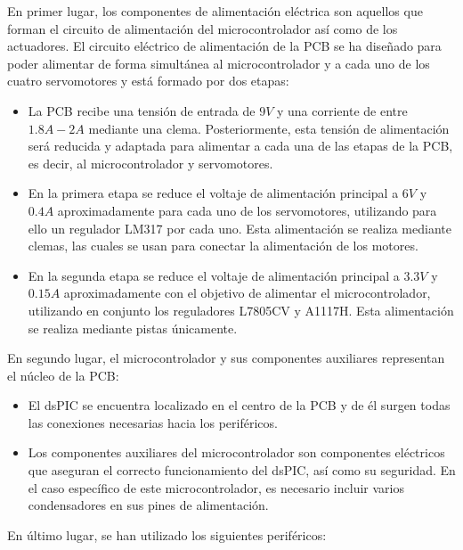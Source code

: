 En primer lugar, los componentes de alimentación eléctrica son aquellos que forman el circuito de alimentación del microcontrolador así como de los actuadores. El circuito eléctrico de alimentación de la \ac{PCB} se ha diseñado para poder alimentar de forma simultánea al microcontrolador y a cada uno de los cuatro servomotores y está formado por dos etapas:
\begin{itemize}
    \item La \ac{PCB} recibe una tensión de entrada de $9V$ y una corriente de entre $1.8A - 2A$ mediante una clema. Posteriormente, esta tensión de alimentación será reducida y adaptada para alimentar a cada una de las etapas de la \ac{PCB}, es decir, al microcontrolador y servomotores.
    \item En la primera etapa se reduce el voltaje de alimentación principal a $6V$ y $0.4A$ aproximadamente para cada uno de los servomotores, utilizando para ello un regulador LM317 por cada uno. Esta alimentación se realiza mediante clemas, las cuales se usan para conectar la alimentación de los motores.
    
    \item En la segunda etapa se reduce el voltaje de alimentación principal a $3.3V$ y $0.15A$ aproximadamente con el objetivo de alimentar el microcontrolador, utilizando en conjunto los reguladores L7805CV y A1117H. Esta alimentación se realiza mediante pistas únicamente.
\end{itemize}

En segundo lugar, el microcontrolador y sus componentes auxiliares representan el núcleo de la \ac{PCB}:
\begin{itemize}
    \item El dsPIC se encuentra localizado en el centro de la \ac{PCB} y de él surgen todas las conexiones necesarias hacia los periféricos.
    \item Los componentes auxiliares del microcontrolador son componentes eléctricos que aseguran el correcto funcionamiento del dsPIC, así como su seguridad. En el caso específico de este microcontrolador, es necesario incluir varios condensadores en sus pines de alimentación.
\end{itemize}

En último lugar, se han utilizado los siguientes periféricos:

